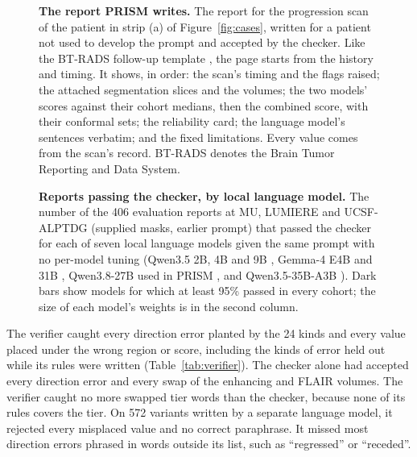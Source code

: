 \documentclass[largeformat]{interact} %
\begin{document}
\begin{figure}[!htbp]
\centering
{}
\caption{\textbf{The report PRISM writes.} The report for the progression scan of the patient in strip (a) of
Figure~\ref{fig:cases}, written for a patient not used to develop the prompt and accepted by the checker. Like the BT-RADS follow-up template \citep{btradsweb}, the page starts from the history and timing. It shows, in
order: the scan's timing and the flags raised; the attached
segmentation slices and the volumes; the two models' scores against their cohort medians, then the combined score,
with their conformal sets; the reliability card; the language model's sentences verbatim; and the fixed limitations.
Every value comes from the scan's record.
BT-RADS denotes the Brain Tumor Reporting and Data System.}
\label{fig:5}
\end{figure}

\begin{figure}[!htbp]
\centering
{}
\caption{\textbf{Reports passing the checker, by local language model.} The number of the 406 evaluation reports at MU, LUMIERE and UCSF-ALPTDG (supplied masks, earlier prompt) that
passed the checker for each of seven local language models given the same prompt with no per-model tuning (Qwen3.5 2B, 4B and 9B \citep{qwen2026b}, Gemma-4 E4B and 31B \citep{gemma2026}, Qwen3.8-27B used in PRISM
\citep{qwen2026}, and Qwen3.5-35B-A3B \citep{qwen2026b}). Dark bars show
models for which at least 95\% passed in every cohort; the size of each model's weights is in the second column.}
\label{fig:llm}
\end{figure}

The verifier caught every direction error planted by the 24 kinds and every value placed under the wrong region or
score,
including the kinds of error held out while its rules were written (Table~\ref{tab:verifier}). The checker alone had
accepted every direction error and every swap of the enhancing and FLAIR volumes. The verifier caught no more swapped
tier words than the checker, because none of its rules covers the tier. On 572 variants written by a separate language
model, it rejected every misplaced value and no correct paraphrase. It missed most direction errors phrased in words
outside its list, such as ``regressed'' or ``receded''.
\end{document}
